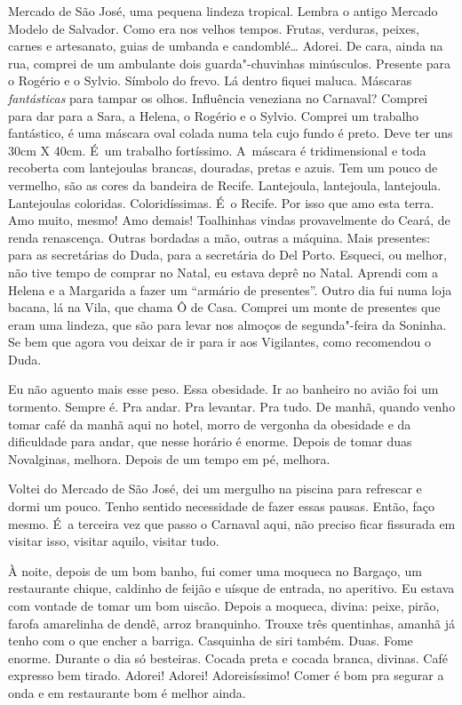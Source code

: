 Mercado de São José, uma pequena lindeza tropical. Lembra o antigo
Mercado Modelo de Salvador. Como era nos velhos tempos. Frutas,
verduras, peixes, carnes e artesanato, guias de umbanda e
candomblé… Adorei. De cara, ainda na rua, comprei de um ambulante
dois guarda"-chuvinhas minúsculos. Presente para o Rogério e o Sylvio.
Símbolo do frevo. Lá dentro fiquei maluca. Máscaras
\emph{fantásticas}\textbf{} para tampar os olhos. Influência veneziana
no Carnaval? Comprei para dar para a Sara, a Helena, o Rogério e o
Sylvio. Comprei um trabalho fantástico, é uma máscara oval colada numa
tela cujo fundo é preto. Deve ter uns 30cm X 40cm. É~um trabalho
fortíssimo. A~máscara é tridimensional e toda recoberta com lantejoulas
brancas, douradas, pretas e azuis. Tem um pouco de vermelho, são as
cores da bandeira de Recife. Lantejoula, lantejoula, lantejoula.
Lantejoulas coloridas. Coloridíssimas. É~o Recife. Por isso que amo esta
terra. Amo muito, mesmo! Amo demais! Toalhinhas vindas provavelmente do
Ceará, de renda renascença. Outras bordadas a mão, outras a máquina.
Mais presentes: para as secretárias do Duda, para a secretária do Del
Porto. Esqueci, ou melhor, não tive tempo de comprar no Natal, eu estava
deprê no Natal. Aprendi com a Helena e a Margarida a fazer um ``armário
de presentes''. Outro dia fui numa loja bacana, lá na Vila, que chama Ô
de Casa. Comprei um monte de presentes que eram uma lindeza, que são
para levar nos almoços de segunda"-feira da Soninha. Se bem que agora vou
deixar de ir para ir aos Vigilantes, como recomendou o Duda.

Eu não aguento mais esse peso. Essa obesidade. Ir ao banheiro no avião
foi um tormento. Sempre é. Pra andar. Pra levantar. Pra tudo. De manhã,
quando venho tomar café da manhã aqui no hotel, morro de vergonha da
obesidade e da dificuldade para andar, que nesse horário é enorme.
Depois de tomar duas Novalginas, melhora. Depois de um tempo em pé,
melhora.

Voltei do Mercado de São José, dei um mergulho na piscina para refrescar
e dormi um pouco. Tenho sentido necessidade de fazer essas pausas.
Então, faço mesmo. É~a terceira vez que passo o Carnaval aqui, não
preciso ficar fissurada em visitar isso, visitar aquilo, visitar tudo.

À noite, depois de um bom banho, fui comer uma moqueca no Bargaço, um
restaurante chique, caldinho de feijão e uísque de entrada, no
aperitivo. Eu estava com vontade de tomar um bom uiscão. Depois a
moqueca, divina: peixe, pirão, farofa amarelinha de dendê, arroz
branquinho. Trouxe três quentinhas, amanhã já tenho com o que encher a
barriga. Casquinha de siri também. Duas. Fome enorme. Durante o dia só
besteiras. Cocada preta e cocada branca, divinas. Café expresso bem
tirado. Adorei! Adorei! Adoreisíssimo! Comer é bom pra segurar a onda
e em restaurante bom é melhor ainda.

